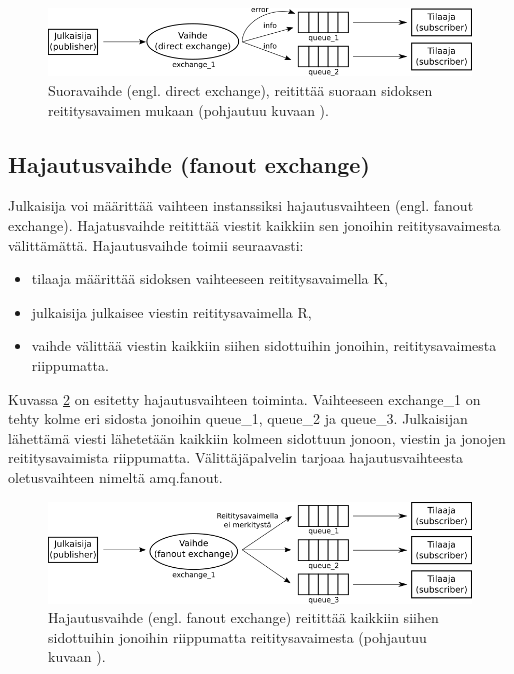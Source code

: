 \begin{figure}[ht!]
	\includegraphics[width=1\textwidth]{pictures/amqp-direct-exchange.png}
	\caption{Suoravaihde (engl. direct exchange), reitittää suoraan sidoksen reititysavaimen mukaan (pohjautuu kuvaan \cite{RabbitMQ-Tutorial-Routing}).}
	\label{fig:amqp-direct-exchange}
\end{figure}


\subsection{Hajautusvaihde (fanout exchange)}
Julkaisija voi määrittää vaihteen instanssiksi hajautusvaihteen (engl. fanout exchange). Hajatusvaihde reitittää viestit kaikkiin sen jonoihin reititysavaimesta välittämättä. Hajautusvaihde toimii seuraavasti:
\begin{itemize}
	\item tilaaja määrittää sidoksen vaihteeseen reititysavaimella K,
	\item julkaisija julkaisee viestin reititysavaimella R,
	\item vaihde välittää viestin kaikkiin siihen sidottuihin jonoihin, reititysavaimesta riippumatta.
\end{itemize}
Kuvassa \ref{fig:amqp-fanout-exchange} on esitetty hajautusvaihteen toiminta. Vaihteeseen exchange\_1 on tehty kolme eri sidosta jonoihin queue\_1, queue\_2 ja queue\_3. Julkaisijan lähettämä viesti lähetetään kaikkiin kolmeen sidottuun jonoon, viestin ja jonojen reititysavaimista riippumatta. Välittäjäpalvelin tarjoaa hajautusvaihteesta oletusvaihteen nimeltä amq.fanout. \cite[s.~27]{AMQP-specification}

\begin{figure}[ht!]
	\includegraphics[width=1\textwidth]{pictures/amqp-fanout-exchange.png}
	\caption{Hajautusvaihde (engl. fanout exchange) reitittää kaikkiin siihen sidottuihin jonoihin riippumatta reititysavaimesta (pohjautuu kuvaan \cite{RabbitMQ-AMQP-0-9-1-Model-Explained}).}
	\label{fig:amqp-fanout-exchange}
\end{figure}


